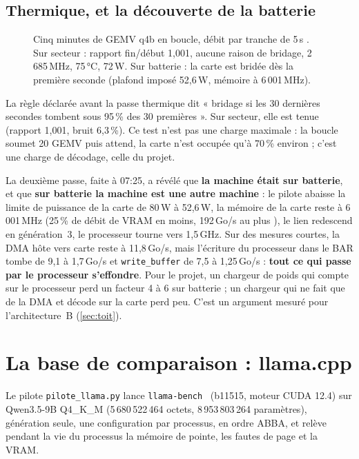 \subsection{Thermique, et la découverte de la batterie}\label{sec:batterie}

\begin{figure}[ht]
\centering
\GrapheThermique
\caption[Cinq minutes de GEMV, secteur contre batterie]{Cinq minutes de GEMV q4b en boucle, débit par tranche de 5\,s \mes. Sur secteur : rapport fin/début 1,001, aucune raison de bridage, 2\,685\,MHz, 75\,°C, 72\,W. Sur batterie : la carte est bridée dès la première seconde (plafond imposé 52,6\,W, mémoire à 6\,001\,MHz).}
\label{fig:thermique}
\end{figure}

La règle déclarée avant la passe thermique dit « bridage si les 30 dernières secondes tombent sous 95\,\% des 30 premières ». Sur secteur, elle est tenue (rapport 1,001, bruit 6,3\,\%). Ce test n'est pas une charge maximale : la boucle soumet 20 GEMV puis attend, la carte n'est occupée qu'à 70\,\% environ ; c'est une charge de décodage, celle du projet.

La deuxième passe, faite à 07:25, a révélé que \textbf{la machine était sur batterie}, et que \textbf{sur batterie la machine est une autre machine} : le pilote abaisse la limite de puissance de la carte de 80\,W à 52,6\,W, la mémoire de la carte reste à 6\,001\,MHz (25\,\% de débit de VRAM en moins, 192\,Go/s au plus \calc), le lien redescend en génération~3, le processeur tourne vers 1,5\,GHz. Sur des mesures courtes, la DMA hôte vers carte reste à 11,8\,Go/s, mais l'écriture du processeur dans le BAR tombe de 9,1 à 1,7\,Go/s et \texttt{write\_buffer} de 7,5 à 1,25\,Go/s : \textbf{tout ce qui passe par le processeur s'effondre}. Pour le projet, un chargeur de poids qui compte sur le processeur perd un facteur 4 à 6 sur batterie ; un chargeur qui ne fait que de la DMA et décode sur la carte perd peu. C'est un argument mesuré pour l'architecture~B (\cref{sec:toit}).

\section{La base de comparaison : llama.cpp}\label{sec:llamacpp}

Le pilote \texttt{pilote\_llama.py} lance \texttt{llama-bench}~\cite{ggml2026llamacpp} (b11515, moteur CUDA 12.4) sur Qwen3.5-9B Q4\_K\_M (5\,680\,522\,464 octets, 8\,953\,803\,264 paramètres), génération seule, une configuration par processus, en ordre ABBA, et relève pendant la vie du processus la mémoire de pointe, les fautes de page et la VRAM.

